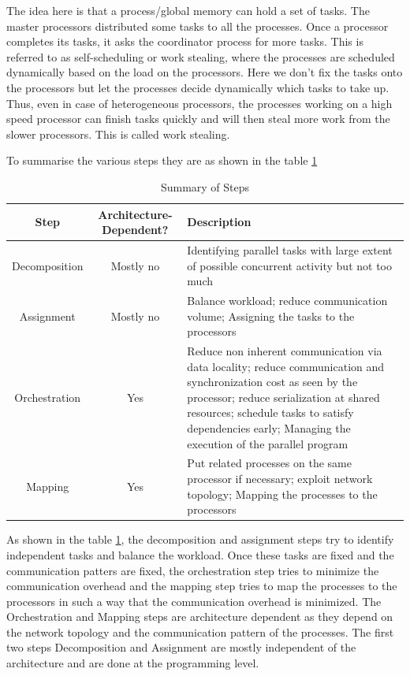 \documentclass[12pt]{book}
\begin{document}
The idea here is that a process/global memory can hold a set of tasks. The master processors distributed some tasks to all the processes. Once a processor completes its tasks, it asks the coordinator process for more tasks.
This is referred to as self-scheduling or work stealing, where the processes are scheduled dynamically based on the load on the processors. Here we don't fix the tasks onto the processors but let the processes decide dynamically which tasks to take up.
Thus, even in case of heterogeneous processors, the processes working on a high speed processor can finish tasks quickly and will then steal more work from the slower processors. This is called work stealing.


To summarise the various steps they are as shown in the table \ref{tab:summary}
\begin{table}[H]
    \centering
    \begin{tabular}{|c|c|p{}|}
        \hline
        \textbf{Step} & Architecture-Dependent? &  \textbf{Description} \\
        \hline
        Decomposition & Mostly no &  Identifying parallel tasks with large extent of possible concurrent activity but not too much \\
        Assignment & Mostly no & Balance workload; reduce communication volume; Assigning the tasks to the processors \\
        Orchestration & Yes & Reduce non inherent communication via data locality; reduce communication and synchronization cost as seen by the processor; reduce serialization at shared resources; schedule tasks to satisfy dependencies early;
        Managing the execution of the parallel program \\
        Mapping & Yes & Put related processes on the same processor if necessary; exploit network topology; Mapping the processes to the processors \\
        \hline
    \end{tabular}
    \caption{Summary of Steps}
    \label{tab:summary}
\end{table}
As shown in the table \ref{tab:summary}, the decomposition and assignment steps try to identify independent tasks and balance the workload. Once these tasks are fixed and the communication patters are fixed,
the orchestration step tries to minimize the communication overhead and the mapping step tries to map the processes to the processors in such a way that the communication overhead is minimized. The Orchestration and Mapping steps are architecture dependent as they depend on the network topology and the communication pattern of the processes.
The first two steps Decomposition and Assignment are mostly independent of the architecture and are done at the programming level.
\end{document}

